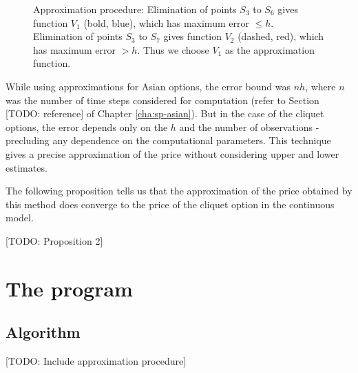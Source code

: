 \begin{figure}
	\caption{Approximation procedure: Elimination of points $ S_3 $ to $ S_6 $ gives function $ V_1 $ (bold, blue), which has maximum error $ \le h $. Elimination of points $ S_3 $ to $ S_7 $ gives function $ V_2 $ (dashed, red), which has maximum error $ > h $. Thus we choose $ V_1 $ as the  approximation function.}
	\label{fig:sp-clq-approx}
\end{figure}


\begin{rem}
	While using approximations for Asian options, the error bound was $ nh $, where $ n $ was the number of time steps considered for computation (refer to Section [TODO: reference] of Chapter \ref{cha:sp-asian}). But in the case of the cliquet options, the error depends only on the $ h $ and the number of observations - precluding any dependence on the computational parameters. This technique gives a precise approximation of the price without considering upper and lower estimates.
\end{rem}

The following proposition tells us that the approximation of the price obtained by this method does converge to the price of the cliquet option in the continuous model.

[TODO: Proposition 2]



\section{The program}
\label{sec:sp-clq-program}

\subsection{Algorithm}
[TODO: Include approximation procedure]

